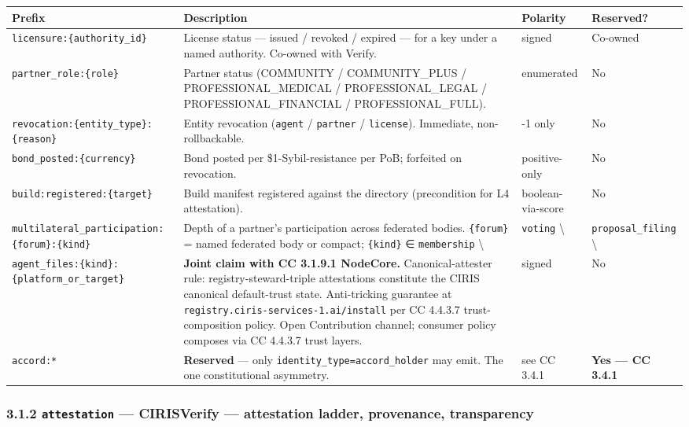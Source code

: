 \documentclass[11pt]{article}
\begin{document}
{\scriptsize
\begin{longtable}{|p{4.0cm}|p{4.0cm}|p{4.0cm}|p{4.0cm}|}\hline
\textbf{Prefix} & \textbf{Description} & \textbf{Polarity} & \textbf{Reserved?} \\ \hline\endhead
\texttt{licensure:\{authority\_id\}} & License status — issued / revoked / expired — for a key under a named authority. Co-owned with Verify. & signed & Co-owned \\ \hline
\texttt{partner\_role:\{role\}} & Partner status (COMMUNITY / COMMUNITY\_PLUS / PROFESSIONAL\_MEDICAL / PROFESSIONAL\_LEGAL / PROFESSIONAL\_FINANCIAL / PROFESSIONAL\_FULL). & enumerated & No \\ \hline
\texttt{revocation:\{entity\_type\}:\{reason\}} & Entity revocation (\texttt{agent} / \texttt{partner} / \texttt{license}). Immediate, non-rollbackable. & -1 only & No \\ \hline
\texttt{bond\_posted:\{currency\}} & Bond posted per \$1-Sybil-resistance per PoB; forfeited on revocation. & positive-only & No \\ \hline
\texttt{build:registered:\{target\}} & Build manifest registered against the directory (precondition for L4 attestation). & boolean-via-score & No \\ \hline
\texttt{multilateral\_participation:\{forum\}:\{kind\}} & Depth of a partner's participation across federated bodies. \texttt{\{forum\}} = named federated body or compact; \texttt{\{kind\}} ∈ \texttt{membership} \textbackslash{} & \texttt{voting} \textbackslash{} & \texttt{proposal\_filing} \textbackslash{} \\ \hline
\texttt{agent\_files:\{kind\}:\{platform\_or\_target\}} & \textbf{Joint claim with CC 3.1.9.1 NodeCore.} Canonical-attester rule: registry-steward-triple attestations constitute the CIRIS canonical default-trust state. Anti-tricking guarantee at \texttt{registry.ciris-services-1.ai/install} per CC 4.4.3.7 trust-composition policy. Open Contribution channel; consumer policy composes via CC 4.4.3.7 trust layers. & signed & No \\ \hline
\texttt{accord:*} & \textbf{Reserved} — only \texttt{identity\_type=accord\_holder} may emit. The one constitutional asymmetry. & see CC 3.4.1 & \textbf{Yes — CC 3.4.1} \\ \hline
\end{longtable}}


\subsubsection*{3.1.2 \texttt{attestation} — CIRISVerify — attestation ladder, provenance, transparency}
\end{document}
